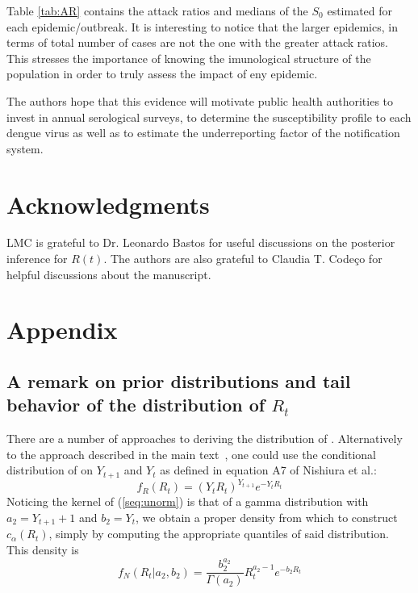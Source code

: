 Table \ref{tab:AR} contains the attack ratios and medians of the $S_0$ 
estimated for each epidemic/outbreak. It is interesting to notice that the 
larger epidemics, in terms of total number of cases are not the one with the 
greater attack ratios. This stresses the importance of knowing the imunological 
structure of the population in order to truly assess the impact of eny 
epidemic. 

The authors hope that this evidence will motivate public health 
authorities to invest in annual serological surveys, to determine the 
susceptibility profile to each dengue virus as well as to estimate the 
underreporting factor of the notification system.
\section*{Acknowledgments}
LMC is grateful to Dr. Leonardo Bastos for useful discussions on the 
posterior inference for $R(t)$.
The authors are also grateful to Claudia T. 
Code\c{c}o for helpful discussions about the manuscript.

\section*{Appendix}
\subsection*{A remark on prior distributions and tail behavior of the 
distribution of $R_t$}
\label{sec:tails}
There are a number of approaches to deriving the distribution of \rr.
Alternatively to the approach described in the main text~\cite{mantel}, one 
could use the conditional distribution of \rr on 
$Y_{t+1}$ and $Y_t$ as defined in equation A7 of Nishiura et al.\cite{nishiura}:
\begin{equation}
\label{seq:unorm}
f_{R}(R_{t}) = (Y_tR_{t})^{Y_{t+1}} e^{-Y_tR_{t}}
\end{equation}
Noticing the kernel of (\ref{seq:unorm}) is that of a gamma distribution with 
$a_2 = Y_{t+1}+1$ and $b_2 = Y_t$, we obtain a proper density from which to 
construct $c_{\alpha}(R_t)$, simply by computing the appropriate quantiles of 
said distribution.
 This density is
\begin{equation}
\label{seq:densityNishiura}
f_N(R_t| a_2, b_2) =  \frac{b_2^{a_2}}{\Gamma(a_2)} R_t^{a_2-1} e^{-b_2 R_t}
\end{equation}

